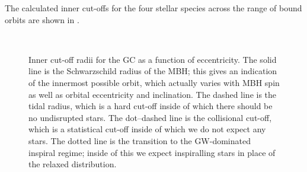 The calculated inner cut-offs for the four stellar species across the range of bound orbits are shown in .
\begin{figure}%
\centering
    \quad 
    \\
    \quad
\caption{Inner cut-off radii for the GC as a function of eccentricity. The solid line is the Schwarzschild radius of the MBH; this gives an indication of the innermost possible orbit, which actually varies with MBH spin as well as orbital eccentricity and inclination. The dashed line is the tidal radius, which is a hard cut-off inside of which there should be no undisrupted stars. The dot--dashed line is the collisional cut-off, which is a statistical cut-off inside of which we do not expect any stars. The dotted line is the transition to the GW-dominated inspiral regime; inside of this we expect inspiralling stars in place of the relaxed distribution.}\label{fig:Cuts}
\end{figure}
